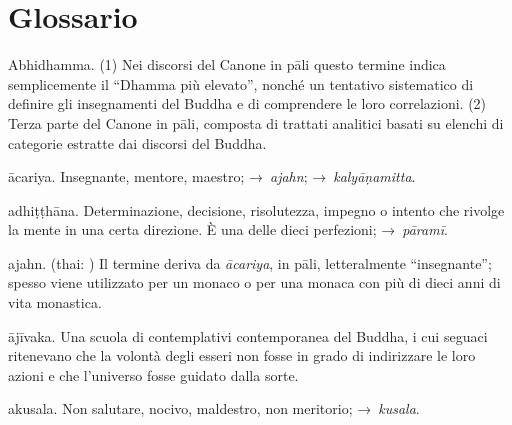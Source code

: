 
\chapter{Glossario}

\begin{glossarydescription}


\item[Abhidhamma.] (1) Nei discorsi del Canone in pāli questo termine
  indica semplicemente il ``Dhamma più elevato'', nonché un tentativo
  sistematico di definire gli insegnamenti del Buddha e di comprendere le loro
  correlazioni. (2) Terza parte del Canone in pāli, composta di trattati
  analitici basati su elenchi di categorie estratte dai discorsi del Buddha.

\item[ācariya.] Insegnante, mentore, maestro; →~\emph{ajahn};
  →~\emph{kalyāṇamitta}.

\item[adhiṭṭhāna.] Determinazione, decisione, risolutezza, impegno o
  intento che rivolge la mente in una certa direzione. È una delle dieci
  perfezioni; →~\emph{pāramī}.

\item[ajahn.] (thai: ) Il termine deriva da \emph{ācariya}, in pāli,
  letteralmente ``insegnante''; spesso viene utilizzato per un monaco o per una
  monaca con più di dieci anni di vita monastica.

\item[ājīvaka.] Una scuola di contemplativi contemporanea del Buddha, i
  cui seguaci ritenevano che la volontà degli esseri non fosse in grado di
  indirizzare le loro azioni e che l'universo fosse guidato dalla sorte.

\item[akusala.] Non salutare, nocivo, maldestro, non meritorio;
  →~\emph{kusala}.


\end{glossarydescription}
